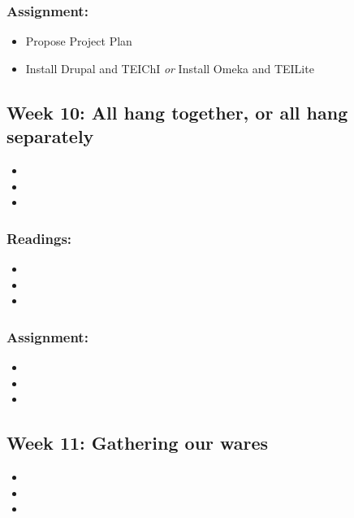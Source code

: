 \documentclass[]{article}
\begin{document}
\subsubsection{Assignment:}\label{assignment-7}

\begin{itemize}
\itemsep1pt\parskip0pt
\item
  Propose Project Plan
\item
  Install Drupal and TEIChI \emph{or} Install Omeka and TEILite
\end{itemize}

\subsection{Week 10: All hang together, or all hang
separately}\label{week-10-all-hang-together-or-all-hang-separately}

\begin{itemize}
\item
\item
\item
\end{itemize}

\subsubsection{Readings:}\label{readings-8}

\begin{itemize}
\item
\item
\item
\end{itemize}

\subsubsection{Assignment:}\label{assignment-8}

\begin{itemize}
\item
\item
\item
\end{itemize}

\subsection{Week 11: Gathering our
wares}\label{week-11-gathering-our-wares}

\begin{itemize}
\item
\item
\item
\end{itemize}
\end{document}
